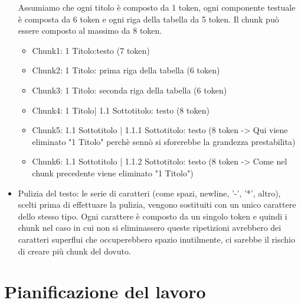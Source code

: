\begin{itemize}
    Assumiamo che ogni titolo è composto da 1 token, ogni componente testuale è composta da 6 token e ogni riga della tabella da 5 token. Il chunk può essere composto al massimo da 8 token.
    \begin{tcolorbox}[colback=white, colframe=black]
        \begin{itemize}
            \item Chunk1: 1 Titolo:testo (7 token)
            \item Chunk2: 1 Titolo: prima riga della tabella (6 token)
            \item Chunk3: 1 Titolo: seconda riga della tabella (6 token)
            \item Chunk4: 1 Titolo| 1.1 Sottotitolo: testo (8 token)
            \item Chunk5: 1.1 Sottotitolo | 1.1.1 Sottotitolo: testo (8 token -> Qui viene eliminato "1 Titolo" perchè sennò si sforerebbe la grandezza prestabilita)
            \item Chunk6: 1.1 Sottotitolo | 1.1.2 Sottotitolo: testo (8 token -> Come nel chunk precedente viene eliminato "1 Titolo")
        \end{itemize}
    \end{tcolorbox}
    
    \item Pulizia del testo: le serie di caratteri  (come spazi, newline, '-', '*', altro), scelti prima di effettuare la pulizia, vengono sostituiti con un unico carattere dello stesso tipo.
    \noindent Ogni carattere è composto da un singolo token e quindi i chunk nel caso in cui non si eliminassero queste ripetizioni avrebbero dei caratteri superflui che occuperebbero spazio inutilmente, ci sarebbe il rischio di creare più chunk del dovuto.  
\end{itemize}

\section{Pianificazione del lavoro}

